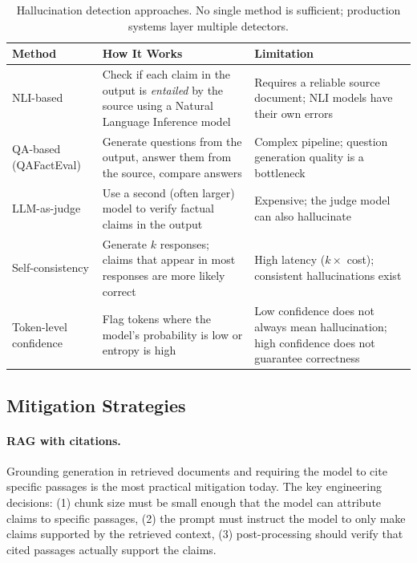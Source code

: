 \begin{table}[H]
\centering
\caption{Hallucination detection approaches.  No single method is sufficient;
production systems layer multiple detectors.}
\label{tab:hallucination_detection}
\begin{tabularx}{\textwidth}{l X l}
\toprule
\textbf{Method} & \textbf{How It Works} & \textbf{Limitation} \\
\midrule
NLI-based & Check if each claim in the output is \emph{entailed} by the source
    using a Natural Language Inference model & Requires a reliable source
    document; NLI models have their own errors \\
QA-based (QAFactEval) & Generate questions from the output, answer them from
    the source, compare answers & Complex pipeline; question generation
    quality is a bottleneck \\
LLM-as-judge & Use a second (often larger) model to verify factual claims
    in the output & Expensive; the judge model can also hallucinate \\
Self-consistency & Generate $k$ responses; claims that appear in most
    responses are more likely correct & High latency ($k\times$ cost);
    consistent hallucinations exist \\
Token-level confidence & Flag tokens where the model's probability is low
    or entropy is high & Low confidence does not always mean hallucination;
    high confidence does not guarantee correctness \\
\bottomrule
\end{tabularx}
\end{table}

\subsection{Mitigation Strategies}

\paragraph{RAG with citations.}
Grounding generation in retrieved documents and requiring the model to cite
specific passages is the most practical mitigation today.  The key engineering
decisions: (1) chunk size must be small enough that the model can attribute
claims to specific passages, (2) the prompt must instruct the model to only
make claims supported by the retrieved context, (3) post-processing should
verify that cited passages actually support the claims.

